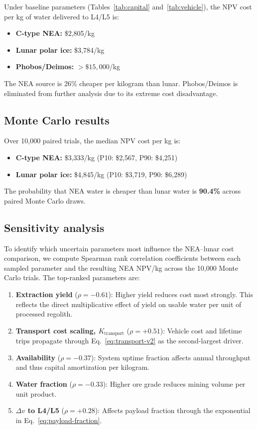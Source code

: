 \documentclass[preprint,12pt]{elsarticle}
\begin{document}
Under baseline parameters (Tables~\ref{tab:capital} and~\ref{tab:vehicle}), the NPV cost per kg of water delivered to L4/L5 is:
\begin{itemize}
    \item \textbf{C-type NEA:} \$2,805/kg
    \item \textbf{Lunar polar ice:} \$3,784/kg
    \item \textbf{Phobos/Deimos:} $>\$15{,}000$/kg
\end{itemize}

The NEA source is 26\% cheaper per kilogram than lunar. Phobos/Deimos is eliminated from further analysis due to its extreme cost disadvantage.

\subsection{Monte Carlo results}

Over 10,000 paired trials, the median NPV cost per kg is:
\begin{itemize}
    \item \textbf{C-type NEA:} \$3,333/kg (P10: \$2,567, P90: \$4,251)
    \item \textbf{Lunar polar ice:} \$4,845/kg (P10: \$3,719, P90: \$6,289)
\end{itemize}

The probability that NEA water is cheaper than lunar water is \textbf{90.4\%} across paired Monte Carlo draws.

\subsection{Sensitivity analysis}

To identify which uncertain parameters most influence the NEA--lunar cost comparison, we compute Spearman rank correlation coefficients between each sampled parameter and the resulting NEA NPV/kg across the 10,000 Monte Carlo trials. The top-ranked parameters are:

\begin{enumerate}
    \item \textbf{Extraction yield} ($\rho = -0.61$): Higher yield reduces cost most strongly. This reflects the direct multiplicative effect of yield on usable water per unit of processed regolith.
    \item \textbf{Transport cost scaling, $K_\text{transport}$} ($\rho = +0.51$): Vehicle cost and lifetime trips propagate through Eq.~\ref{eq:transport-v2} as the second-largest driver.
    \item \textbf{Availability} ($\rho = -0.37$): System uptime fraction affects annual throughput and thus capital amortization per kilogram.
    \item \textbf{Water fraction} ($\rho = -0.33$): Higher ore grade reduces mining volume per unit product.
    \item \textbf{$\Delta v$ to L4/L5} ($\rho = +0.28$): Affects payload fraction through the exponential in Eq.~\ref{eq:payload-fraction}.
\end{enumerate}
\end{document}
